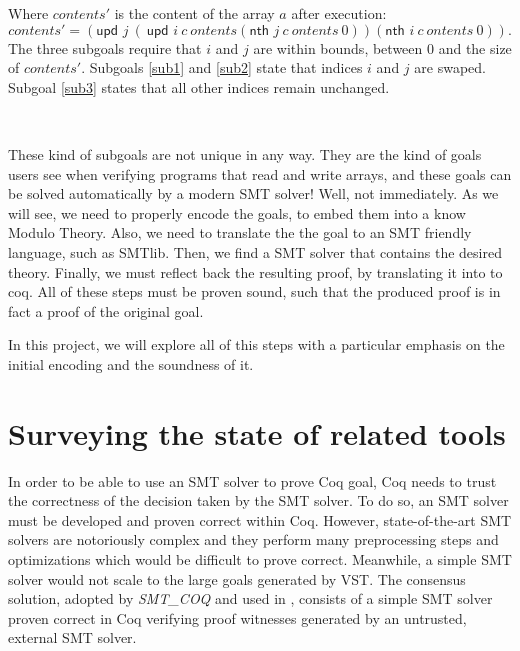 \documentclass[onecolumn, preprint]{sigplanconf}
\newcommand{\nth}[3]{\textsf{nth } #1\ #2\ #3}
\newcommand{\unth}[3]{\textsf{upd } #1\ #2\ #3}
\begin{document}
Where $contents'$ is the content of the array $a$ after execution:
$$contents' = (\unth j (\unth i contents (\nth j contents \  0)) (\nth i contents \  0)).$$
The three subgoals require that $i$ and $j$ are within bounds, between 0 and the size of $contents'$. Subgoals \ref{sub1} and \ref{sub2} state that indices $i$ and $j$ are swaped.
Subgoal \ref{sub3} states that all other indices remain unchanged.

\

These kind of subgoals are not unique in any way. They are the kind of goals users see when verifying programs that read and write arrays, and these goals can be solved automatically by a modern SMT solver! Well, not immediately. As we will see, we need to properly encode the goals, to embed them into a know Modulo Theory. Also, we need to translate the the goal to an SMT friendly language, such as SMTlib. Then, we find a SMT solver that contains the desired theory. Finally, we must reflect back the resulting proof, by translating it into to coq. All of these steps must be proven sound, such that the produced proof is in fact a proof of the original goal. %

In this project, we will explore all of this steps with a particular emphasis on the initial encoding and the soundness of it.











\section{Surveying the state of related tools}
\label{sec:survey}


In order to be able to use an SMT solver to prove Coq goal, Coq needs to trust the correctness of the decision taken by the SMT solver. To do so, an SMT solver must be developed and proven correct within Coq. However, state-of-the-art SMT solvers are notoriously complex and they perform many preprocessing steps and optimizations which would be difficult to prove correct. Meanwhile, a simple SMT solver would not scale to the large goals generated by VST. The consensus solution, adopted by \emph{SMT\_COQ} and used in \cite{appelnote}, consists of a simple SMT solver proven correct in Coq verifying proof witnesses generated by an untrusted, external SMT solver. 
\end{document}
